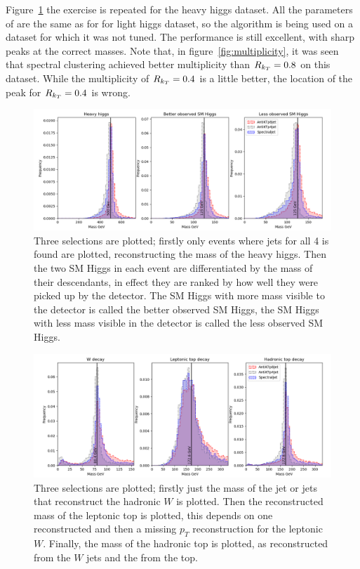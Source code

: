Figure~\ref{fig:heavy_correct_mass_peaks} the exercise is repeated for the heavy higgs dataset.
All the parameters of \spectral{} are the same as for for light higgs dataset,
so the algorithm is being used on a dataset for which it was not tuned.
The performance is still excellent, with sharp peaks at the correct masses.
Note that, in figure~\ref{fig:multiplicity},
it was seen that spectral clustering achieved better multiplicity than \antikt{} \(R_{k_T}{} = 0.8\) on this dataset.
While the multiplicity of \antikt{} \(R_{k_T}{} = 0.4\) is a little better, the location of the peak for
\(R_{k_T} = 0.4\) is wrong.

\begin{figure}[htp]
    \includegraphics[width=1.\textwidth]{graphics/mass_peaks/heavy_long_correct_frequency.png}
    \caption{
Three selections are plotted; firstly only events where jets for all 4  is found
are plotted, reconstructing the mass of the heavy higgs.
Then the two SM Higgs in each event are differentiated by the mass of their descendants,
in effect they are ranked by how well they were picked up by the detector.
The SM Higgs with more mass visible to the detector is called the better observed SM Higgs,
the SM Higgs with less mass visible in the detector is called the less observed SM Higgs.
}\label{fig:heavy_correct_mass_peaks}
\end{figure}    


\begin{figure}[htp]
    \includegraphics[width=1.\textwidth]{graphics/mass_peaks/top_long_correct_frequency.png}
    \caption{
        Three selections are plotted; firstly just the mass of the jet or jets that reconstruct the hadronic \(W\) is plotted.
        Then the reconstructed mass of the leptonic top is plotted,
        this depends on one reconstructed  and then a missing \(p_T\) reconstruction
        for the leptonic \(W\).
        Finally, the mass of the hadronic top is plotted, as reconstructed from the 
        \(W\) jets and the  from the top.
    }\label{fig:top_correct_mass_peaks}
\end{figure}    

